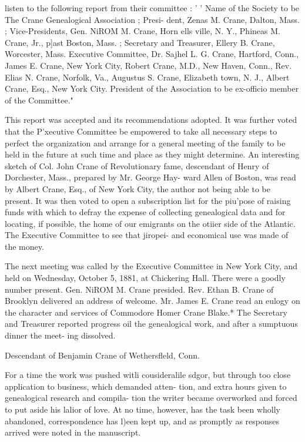 \documentclass{book}
\begin{document}
listen to the following report from their committee : ' ' Name of 
the Society to be The Crane Genealogical Association ; Presi- 
dent, Zenas M. Crane, Dalton, Mass. ; Vice-Presidents, Gen. 
NiROM M. Crane, Horn ells ville, N. Y., Phineas M. Crane, Jr., 
p]ast Boston, Mass. ; Secretary and Treasurer, Ellery B. 
Crane, Worcester, Mass. Executive Committee, Dr. Sajhel 
L. G. Crane, Hartford, Conn., James E. Crane, New York 
City, Robert Crane, M.D., New Haven, Conn., Rev. Elias N. 
Crane, Norfolk, Va., Augustus S. Crane, Elizabeth town, N. 
J., Albert Crane, Esq., New York City. President of the 
Association to be ex-officio member of the Committee." 

This report was accepted and its recommendations adopted. 
It was further voted that the P'xecutive Committee be empowered 
to take all necessary steps to perfect the organization and arrange 
for a general meeting of the family to be held in the future at 
such time and place as they might determine. An interesting 
sketch of Col. John Crane of Revolutionary fame, descendant 
of Henry of Dorchester, Mass., prepared by Mr. George Hay- 
ward Allen of Boston, was read by Albert Crane, Esq., of New 
York City, the author not being able to be present. It was then 
voted to open a subscription list for the piu'pose of raising funds 
with which to defray the expense of collecting genealogical data 
and for locating, if possible, the home of our emigrants on the 
otiier side of the Atlantic. The Executive Committee to see that 
jiropei- and economical use was made of the money. 

The next meeting was called by the Executive Committee in 
New York City, and held on Wednesday, October 5, 1881, at 
Chickering Hall. There were a goodly number present. Gen. 
NiROM M. Crane presided. Rev. Ethan B. Crane of Brooklyn 
delivered an address of welcome. Mr. James E. Crane read an 
eulogy on the character and services of Commodore Homer 
Crane Blake.* The Secretary and Treasurer reported progress 
oil the genealogical work, and after a sumptuous dinner the meet- 
ing dissolved. 



Descendant of Benjamin Crane of Wethersfleld, Conn. 



For a time the work was pushed witli cousideralile sdgor, but 
through too close application to business, which demanded atten- 
tion, and extra hours given to genealogical research and compila- 
tion the writer became overworked and forced to put aside his 
lalior of love. At no time, however, has the task been wholly 
abandoned, correspondence has l)een kept up, and as promptly as 
responses arrived were noted in the manuscript. 
\end{document}
